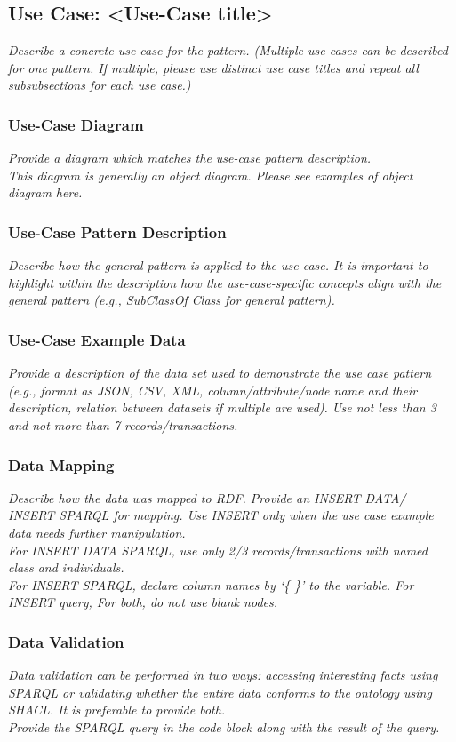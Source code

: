 \subsection*{Use Case: <Use-Case title>}
 \textit{ 
Describe a concrete use case for the pattern. (Multiple use cases can be described for one pattern. If multiple, please use distinct use case titles and repeat all subsubsections for each use case.)
  }

\subsubsection*{Use-Case Diagram}
 \textit{ 
Provide a diagram which matches the use-case pattern description. \\
\noindent \textit{This diagram is generally an object diagram. Please see examples of object diagram here.}
  }

\subsubsection*{Use-Case Pattern Description}
 \textit{ 
Describe how the general pattern is applied to the use case. It is important to highlight within the description how the use-case-specific concepts align with the general pattern (e.g., SubClassOf Class for general pattern).
  }

\subsubsection*{Use-Case Example Data}
 \textit{ 
Provide a description of the data set used to demonstrate the use case pattern (e.g., format as JSON, CSV, XML, column/attribute/node name and their description, relation between datasets if multiple are used). Use not less than 3 and not more than 7 records/transactions.
  }

\subsubsection*{Data Mapping}
 \textit{ 
Describe how the data was mapped to RDF. Provide an INSERT DATA/ INSERT SPARQL for mapping. Use INSERT only when the use case example data needs further manipulation. \\
For INSERT DATA SPARQL, use only 2/3 records/transactions with named class and individuals. \\
For INSERT SPARQL, declare column names by `\{ \}' to the variable.  
For INSERT query, 
For both, do not use blank nodes.    
  }

\subsubsection*{Data Validation}
 \textit{ 
Data validation can be performed in two ways: accessing interesting facts using SPARQL or validating whether the entire data conforms to the ontology using SHACL. It is preferable to provide both. \\
Provide the SPARQL query in the code block along with the result of the query. \\
  }